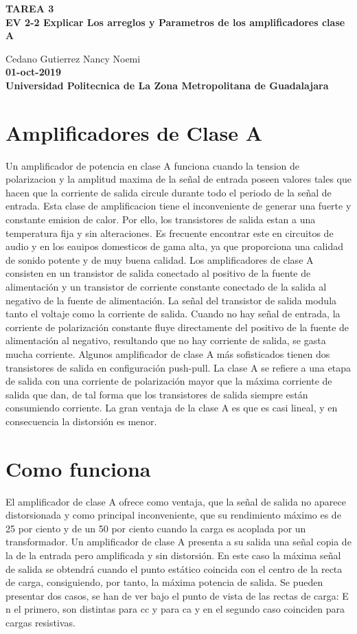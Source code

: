 \documentclass[11pt,a4paper]{article}
\begin{document}
\begin{center}
\textbf{TAREA 3}\\
\textbf{EV 2-2 Explicar Los arreglos y Parametros de los amplificadores clase A}
\end{center}

\begin{center}
Cedano Gutierrez Nancy Noemi\\
\textbf{01-oct-2019}\\
\textbf{Universidad Politecnica de La Zona Metropolitana de Guadalajara}
\end{center}

\section{Amplificadores de Clase A}

Un amplificador de potencia en clase A funciona cuando la tension de polarizacion y la amplitud maxima de la señal de entrada poseen valores tales que hacen que la corriente de salida circule durante todo el periodo de la señal de entrada.
Esta clase de amplificacion tiene el inconveniente de generar una fuerte y constante emision de calor. Por ello, los transistores de salida estan a una temperatura fija y sin alteraciones. Es frecuente encontrar este en circuitos de audio y en los eauipos domesticos de gama alta, ya que proporciona una calidad de sonido potente y de muy buena calidad.
Los amplificadores de clase A consisten en un transistor de salida conectado al positivo de la fuente de alimentación y un transistor de corriente constante conectado de la salida al negativo de la fuente de alimentación. La señal del transistor de salida modula tanto el voltaje como la corriente de salida. Cuando no hay señal de entrada, la corriente de polarización constante fluye directamente del positivo de la fuente de alimentación al negativo, resultando que no hay corriente de salida, se gasta mucha corriente. Algunos amplificador de clase A más sofisticados tienen dos transistores de salida en configuración push-pull.
La clase A se refiere a una etapa de salida con una corriente de polarización mayor que la máxima corriente de salida que dan, de tal forma que los transistores de salida siempre están consumiendo corriente. La gran ventaja de la clase A es que es casi lineal, y en consecuencia la distorsión es menor.\\
\section{Como funciona}
El amplificador de clase A ofrece como ventaja, que la señal de salida no aparece distorsionada y como principal inconveniente, que su rendimiento máximo es de 25 por ciento y de un 50 por ciento cuando la carga es acoplada por un transformador.
Un amplificador de clase A presenta a su salida una señal copia de la de la entrada pero amplificada y sin distorsión.
En este caso la máxima señal de salida se obtendrá cuando el punto estático coincida con el centro de la recta de carga, consiguiendo, por tanto, la máxima potencia de salida.
Se pueden presentar dos casos, se han de ver bajo el punto de vista de las rectas de carga: E n el primero, son distintas para cc y para ca y en el segundo caso coinciden para cargas resistivas.
\end{document}
